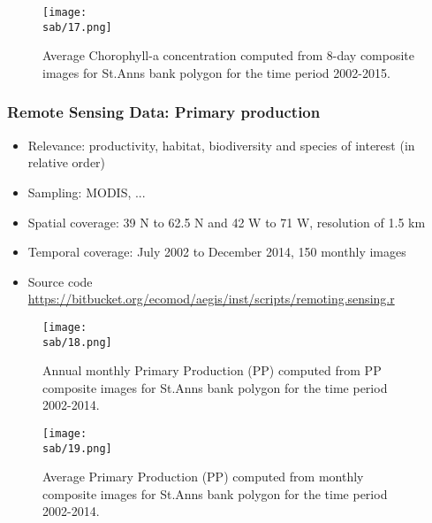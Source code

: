 \documentclass{beamer}
\numberwithin{figure}{section}		%
\numberwithin{table}{section}				%
\newcommand{\D}{.}
\newcommand{\bd}{\string~/bio\D data}   %
\newcommand{\sab}{\bd/mpa/sab}   %
\begin{document}

\begin{frame}[shrink]
  \begin{figure}[h]
    \centering
    \texttt{[image: \\sab/17.png]}
    \caption {Average Chorophyll-a concentration computed from 8-day composite images for St.Anns bank polygon for the time period 2002-2015. }
    \label{fig:ChlaSeasonal}
  \end{figure}
\end{frame}



\begin{frame}
  \frametitle{Remote Sensing Data: Primary production}
  \begin{itemize}
    \item Relevance:  productivity, habitat, biodiversity and species of interest (in relative order)
    \item Sampling:  MODIS, ...
    \item Spatial coverage: 39 N to 62.5 N and 42 W to 71 W, resolution of 1.5 km
    \item Temporal coverage: July 2002 to December 2014, 150 monthly  images
    \item Source code \url{https://bitbucket.org/ecomod/aegis/inst/scripts/remoting.sensing.r}
  \end{itemize}
\end{frame}



\begin{frame}[shrink]
  \begin{figure}[h]
    \centering
    \texttt{[image: \\sab/18.png]}
    \caption{Annual monthly Primary Production (PP) computed from PP composite images for St.Anns bank polygon for the time period 2002-2014.}
    \label{fig:ppTSmonthly}
  \end{figure}
\end{frame}



\begin{frame}[shrink]
  \begin{figure}[h]
    \centering
    \texttt{[image: \\sab/19.png]}
    \caption{Average Primary Production (PP) computed from monthly composite images for St.Anns bank polygon for the time period 2002-2014.}
    \label{fig:ppTSannual}
  \end{figure}
\end{frame}
\end{document}

